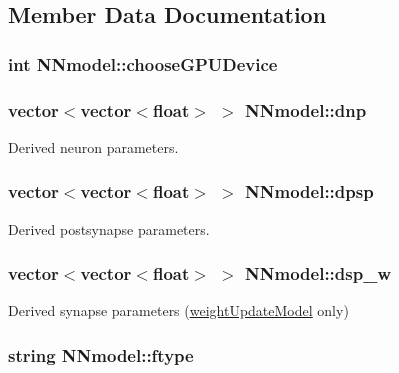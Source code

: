 \subsection{Member Data Documentation}
\hypertarget{classNNmodel_a79631e0c13cdd5ebed55a16bea15819a}{
\subsubsection[{choose\+G\+P\+U\+Device}]{\setlength{\rightskip}{0pt plus 5cm}int N\+Nmodel\+::choose\+G\+P\+U\+Device}}\label{classNNmodel_a79631e0c13cdd5ebed55a16bea15819a}
\hypertarget{classNNmodel_a7f834f3863c06a5b2381c0adddb901b8}{
\subsubsection[{dnp}]{\setlength{\rightskip}{0pt plus 5cm}vector$<$vector$<$float$>$ $>$ N\+Nmodel\+::dnp}}\label{classNNmodel_a7f834f3863c06a5b2381c0adddb901b8}


Derived neuron parameters. 

\hypertarget{classNNmodel_aa03452826c44c9af81eba7a618de7e09}{
\subsubsection[{dpsp}]{\setlength{\rightskip}{0pt plus 5cm}vector$<$vector$<$float$>$ $>$ N\+Nmodel\+::dpsp}}\label{classNNmodel_aa03452826c44c9af81eba7a618de7e09}


Derived postsynapse parameters. 

\hypertarget{classNNmodel_aeb5fa229c8032952feb3440e055f6a85}{
\subsubsection[{dsp\+\_\+w}]{\setlength{\rightskip}{0pt plus 5cm}vector$<$vector$<$float$>$ $>$ N\+Nmodel\+::dsp\+\_\+w}}\label{classNNmodel_aeb5fa229c8032952feb3440e055f6a85}


Derived synapse parameters (\hyperlink{classweightUpdateModel}{weight\+Update\+Model} only) 

\hypertarget{classNNmodel_a917241001f3469a569dbb91aaa6a4039}{
\subsubsection[{ftype}]{\setlength{\rightskip}{0pt plus 5cm}string N\+Nmodel\+::ftype}}\label{classNNmodel_a917241001f3469a569dbb91aaa6a4039}


